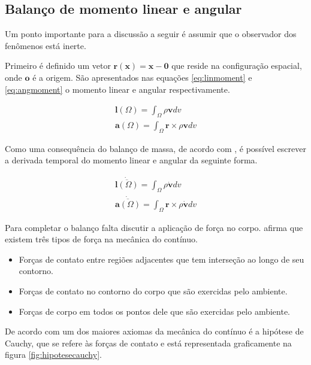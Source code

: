 \subsection{Balanço de momento linear e angular}

Um ponto importante para a discussão a seguir é assumir que o observador dos fenômenos está inerte. \par

Primeiro é definido um vetor $ \boldsymbol{r(x) = x - 0} $ que reside na configuração espacial, onde $ \boldsymbol{o} $ é a origem. São apresentados nas equações \ref{eq:linmoment} e \ref{eq:angmoment} o momento linear e angular respectivamente.

\begin{align}
    \boldsymbol{l}(\Omega) = \int_{\Omega} \rho \boldsymbol{v} dv \label{eq:linmoment} \\
    \boldsymbol{a}(\Omega) = \int_{\Omega} \boldsymbol{r} \times \rho \boldsymbol{v} dv \label{eq:angmoment}
\end{align}

Como uma consequência do balanço de massa, de acordo com \cite{gurtin_fried_anand_2013}, é possível escrever a derivada temporal do momento linear e angular da seguinte forma.

\begin{align}
   \dot{\overline{\boldsymbol{l}(\Omega)}} = \int_{\Omega} \rho \dot{\boldsymbol{v}} dv \label{eq:linmoment} \\
   \dot{\overline{\boldsymbol{a}(\Omega)}} = \int_{\Omega} \boldsymbol{r} \times \rho \dot{\boldsymbol{v}} dv \label{eq:angmoment}
\end{align}


Para completar o balanço falta discutir a aplicação de força no corpo. \cite{gurtin_fried_anand_2013} afirma que existem três tipos de força na mecânica do contínuo. 
\begin{itemize}
    \item Forças de contato entre regiões adjacentes que tem interseção ao longo de seu contorno.
    \item Forças de contato no contorno do corpo que são exercidas pelo ambiente.
    \item Forças de corpo em todos os pontos dele que são exercidas pelo ambiente.
\end{itemize}
De acordo com \cite{gurtin_fried_anand_2013} um dos maiores axiomas da mecânica do contínuo é a hipótese de Cauchy, que se refere às forças de contato e está representada graficamente na figura \ref{fig:hipotesecauchy}. 

